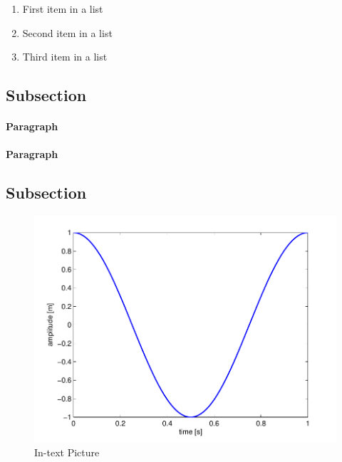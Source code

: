 \documentclass[fleqn,10pt]{SelfArx} %
\begin{document}
\lipsum[5] %

\begin{enumerate}[noitemsep] %
	\item First item in a list
	\item Second item in a list
	\item Third item in a list
\end{enumerate}

\subsection{Subsection}

\lipsum[6] %

\paragraph{Paragraph} \lipsum[7] %
\paragraph{Paragraph} \lipsum[8] %

\subsection{Subsection}

\lipsum[9] %

\begin{figure}[ht]\centering
	\includegraphics[width=\linewidth]{results}
	\caption{In-text Picture}
	\label{fig:results}
\end{figure}
\end{document}
